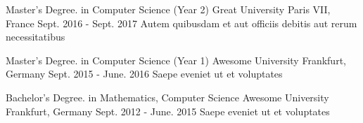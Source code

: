 


\begin{cventries}



\cventry
{Master's Degree. in Computer Science (Year 2)} %
{Great University} %
{Paris VII, France} %
{Sept. 2016 - Sept. 2017} %
{ %
    Autem quibusdam et aut officiis debitis aut rerum necessitatibus
}


\end{cventries}

\begin{cventries}


\cventry
{Master's Degree. in Computer Science (Year 1)} %
{Awesome University} %
{Frankfurt, Germany} %
{Sept. 2015 - June. 2016} %
{ %
    Saepe eveniet ut et voluptates
}


\end{cventries}

\begin{cventries}


\cventry
{Bachelor's Degree. in Mathematics, Computer Science} %
{Awesome University} %
{Frankfurt, Germany} %
{Sept. 2012 - June. 2015} %
{ %
    Saepe eveniet ut et voluptates
}


\end{cventries}
